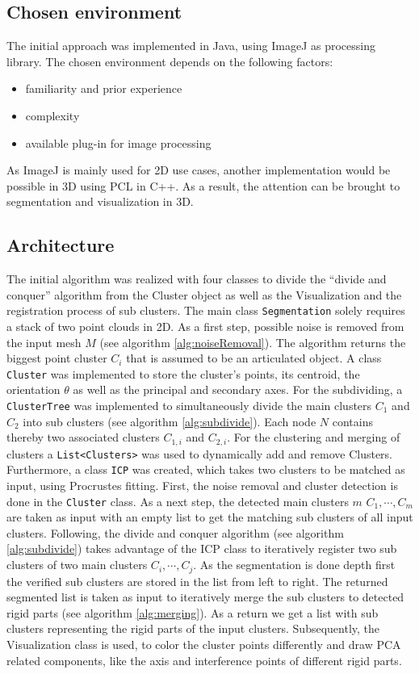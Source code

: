 \subsection{Chosen environment}

The initial approach was implemented in Java, using ImageJ as processing library. The chosen environment depends on the following factors:
\begin{itemize}
	\item familiarity and prior experience
	\item complexity
	\item available plug-in for image processing
\end{itemize}
As ImageJ is mainly used for 2D use cases, another implementation would be possible in 3D using PCL in C++. As a result, the attention can be brought to segmentation and visualization in 3D.

\subsection{Architecture}

The initial algorithm was realized with four classes to divide the ``divide and conquer'' algorithm from the Cluster object as well as the Visualization and the registration process of sub clusters.
The main class \texttt{Segmentation} solely requires a stack of two point clouds in 2D. As a first step, possible noise is removed from the input mesh $M$ (see algorithm \ref{alg:noiseRemoval}). The algorithm returns the biggest point cluster $C_i$ that is assumed to be an articulated object. A class \texttt{Cluster} was implemented to store the cluster's points, its centroid, the orientation $\theta$ as well as the principal and secondary axes. For the subdividing, a \texttt{ClusterTree} was implemented to simultaneously divide the main clusters $C_1$ and $C_2$ into sub clusters (see algorithm \ref{alg:subdivide}). Each node $N$ contains thereby two associated clusters $C_{1,i}$ and $C_{2,i}$. For the clustering and merging of clusters a \texttt{List<Clusters>} was used to dynamically add and remove Clusters. Furthermore, a class \texttt{ICP} was created, which takes two clusters to be matched as input, using Procrustes fitting. First, the noise removal and cluster detection is done in the \texttt{Cluster} class. As a next step, the detected main clusters $m$  $C_1,\cdots,C_{m}$ are taken as input with an empty list to get the matching sub clusters of all input clusters. Following, the divide and conquer algorithm (see algorithm \ref{alg:subdivide}) takes advantage of the ICP class to iteratively register two sub clusters of two main clusters $C_{i},\cdots,C_{j}$. As the segmentation is done depth first the verified sub clusters are stored in the list from left to right. The returned segmented list is taken as input to iteratively merge the sub clusters to detected rigid parts (see algorithm \ref{alg:merging}). As a return we get a list with sub clusters representing the rigid parts of the input clusters. Subsequently, the Visualization class is used, to color the cluster points differently and draw PCA related components, like the axis and interference points of different rigid parts.


